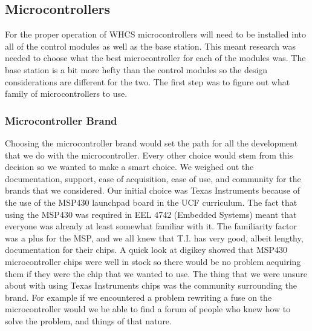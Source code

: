 
\subsection{Microcontrollers}
For the proper operation of WHCS microcontrollers will need to be installed
into all of the control modules as well as the base station. This meant
research was needed to choose what the best microcontroller for each of the
modules was.  The base station is a bit more hefty than the control modules so
the design considerations are different for the two.  The first step was to
figure out what family of microcontrollers to use.

\subsubsection{Microcontroller Brand}
Choosing the microcontroller brand would set the path for all the development
that we do with the microcontroller. Every other choice would stem from this
decision so we wanted to make a smart choice. We weighed out the documentation,
support, ease of acquisition, ease of use, and community for the brands that we
considered. Our initial choice was Texas Instruments because of the use of the
MSP430 launchpad board in the UCF curriculum. The fact that using the MSP430
was required in EEL 4742 (Embedded Systems) meant that everyone was already at
least somewhat familiar with it.  The familiarity factor was a plus for the
MSP, and we all knew that T.I. has very good, albeit lengthy, documentation for
their chips. A quick look at digikey showed that MSP430 microcontroller chips
were well in stock so there would be no problem acquiring them if they were the
chip that we wanted to use. The thing that we were unsure about with using
Texas Instruments chips was the community surrounding the brand. For example if
we encountered a problem rewriting a fuse on the microcontroller would we be
able to find a forum of people who knew how to solve the problem, and things of
that nature.

